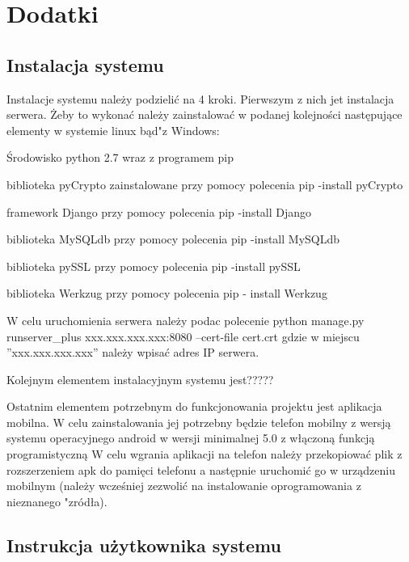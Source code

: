 \newpage
\section*{Dodatki} \label{Dodatki}
\subsection*{Instalacja systemu \NazwaSys}
Instalacje systemu należy podzielić na 4 kroki. Pierwszym z nich jet instalacja serwera.  Żeby to wykonać należy zainstalować w podanej kolejności następujące elementy w systemie linux bąd"z Windows:
\begin{itemize*}
	\item Środowisko python 2.7 wraz z programem pip
	\item biblioteka pyCrypto zainstalowane przy pomocy polecenia pip -install pyCrypto
	\item  framework Django przy pomocy polecenia pip -install Django
	\item biblioteka MySQLdb przy pomocy polecenia pip -install MySQLdb
	\item  biblioteka pySSL przy pomocy polecenia pip -install pySSL
	\item biblioteka Werkzug przy pomocy polecenia pip - install Werkzug
\end{itemize*}
W celu uruchomienia serwera należy podac polecenie python manage.py runserver\_plus xxx.xxx.xxx.xxx:8080 --cert-file cert.crt gdzie w miejscu ''xxx.xxx.xxx.xxx'' należy wpisać adres IP serwera.

Kolejnym elementem instalacyjnym systemu jest?????

Ostatnim elementem potrzebnym do funkcjonowania projektu jest aplikacja mobilna. W celu zainstalowania jej potrzebny będzie telefon mobilny z wersją systemu operacyjnego android w wersji minimalnej 5.0 z włączoną funkcją programistyczną  W celu wgrania aplikacji na telefon należy przekopiować plik z rozszerzeniem apk do pamięci telefonu a następnie uruchomić go w urządzeniu mobilnym (należy wcześniej zezwolić na instalowanie oprogramowania z nieznanego "zródła).

  
\subsection*{Instrukcja użytkownika systemu \NazwaSys}

